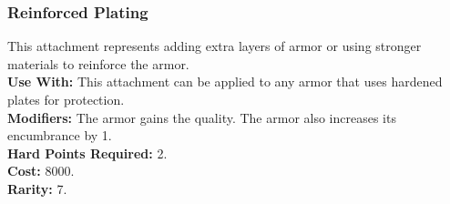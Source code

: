 \subsubsection{Reinforced Plating}
This attachment represents adding extra layers of armor
or using stronger materials to reinforce the armor.\\
\textbf{Use With:} This attachment can be applied to any armor
    that uses hardened plates for protection.\\
\textbf{Modifiers:} The armor gains the  quality. The
    armor also increases its encumbrance by 1.\\
\textbf{Hard Points Required:} 2.\\
\textbf{Cost:} 8000.\\
\textbf{Rarity:} 7.\\
